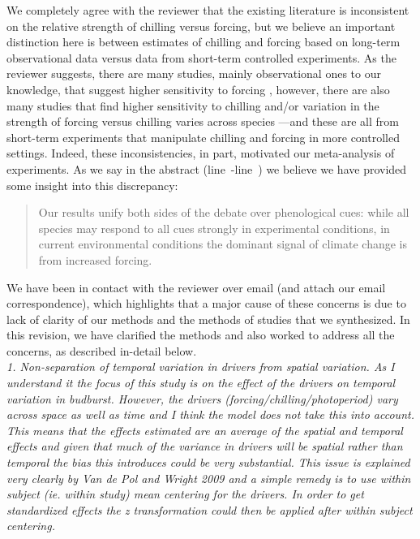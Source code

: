 \documentclass[11pt, a4paper]{article}
\newcommand{\lr}[1]{line~\lineref{#1}}
\begin{document}
We completely agree with the reviewer that the existing literature is inconsistent on the relative strength of chilling versus forcing, but we believe an important distinction here is between estimates of chilling and forcing based on long-term observational data versus data from short-term controlled experiments. As the reviewer suggests, there are many studies, mainly observational ones to our knowledge, that suggest higher sensitivity to forcing \citep[e.g., ][]{fu2012,Rutishauser:2008},  however, there are also many studies that find higher sensitivity to chilling \citep[e.g., ][]{zohner2016, Laube:2014a,Heide:2005aa} and/or variation in the strength of forcing versus chilling varies across species \citep[e.g.,][]{harrington2015,Basler:2014aa,Caffarra:2011a,Caffarra:2011b,koerner2010a}---and these are all from short-term experiments that manipulate chilling and forcing in more controlled settings. Indeed, these inconsistencies, in part, motivated our meta-analysis of experiments. As we say in the abstract (\lr{unifydebatestart}-\lr{unifydebateend}) we believe we have provided some insight into this discrepancy:
\begin{quote}
Our results unify both sides of the debate over phenological cues: while all species may respond to all cues strongly in experimental conditions, in current environmental conditions the dominant signal of climate change is from increased forcing. 
\end{quote}

We have been in contact with the reviewer over email (and attach our email correspondence), which highlights that a major cause of these concerns is due to lack of clarity of our methods and the methods of studies that we synthesized. In this revision, we have clarified the methods and also worked to address all the concerns, as described in-detail below.\\

\emph{1. Non-separation of temporal variation in drivers from spatial variation. As I understand it the
focus of this study is on the effect of the drivers on temporal variation in budburst. However,
the drivers (forcing/chilling/photoperiod) vary across space as well as time and I think the
model does not take this into account. This means that the effects estimated are an average of
the spatial and temporal effects and given that much of the variance in drivers will be spatial
rather than temporal the bias this introduces could be very substantial. This issue is explained
very clearly by Van de Pol and Wright 2009 and a simple remedy is to use within subject (ie.
within study) mean centering for the drivers. In order to get standardized effects the z
transformation could then be applied after within subject centering.}\\
\end{document}
